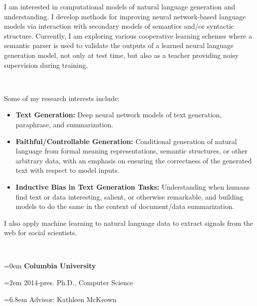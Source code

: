 \documentclass{scrartcl}
\newcommand{\MarginSection}[1]{\marginpar{#1}}
\begin{document}
\begin{cv}{}
\noindent I am interested in computational models of natural language generation and understanding. I develop methods for improving neural network-based language models via interaction with secondary models of semantics and/or syntactic structure. Currently, I am exploring various cooperative learning schemes where a semantic parser is used to validate the outputs of a learned neural language generation model, not only at test time, but also as a teacher providing noisy supervision during training. 

~

\noindent Some of my research interests include:

\begin{itemize}
    \item \textbf{Text Generation:} Deep neural network models of text generation, paraphrase, and summarization.
    \item \textbf{Faithful/Controllable Generation:} Conditional generation of natural language from formal meaning representations, semantic structures, or other arbitrary data, with an emphasis on ensuring the correctness of the generated text with respect to model inputs.
    \item \textbf{Inductive Bias in Text Generation Tasks:} Understanding when humans find text or data interesting, salient, or otherwise remarkable, and building models to do the same in the context of document/data summarization.
\end{itemize}


\noindent I also apply machine learning to natural language data to extract signals from the web for social scientists.

 




 ~\\


{\noindent\hangindent=0em \MarginSection{Education}\textbf{Columbia University}

 \noindent\hangindent=2em 2014-pres. Ph.D., Computer Science 

\noindent\hangindent=6.8em Advisor: Kathleen McKeown

}
\end{cv}
\end{document}
